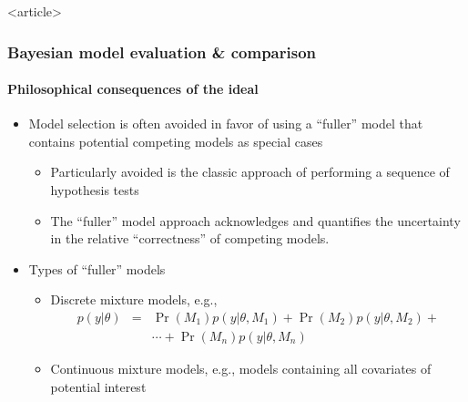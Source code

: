 \documentclass{beamer}
\begin{document}
\begin{frame}<article>
  \frametitle{Bayesian model evaluation \& comparison}
  \framesubtitle{\large Philosophical consequences of the ideal}

  \begin{itemize}
  \item Model selection is often avoided in favor of using a
    ``fuller'' model that contains potential competing models as
    special cases
    \begin{itemize}
    \item Particularly avoided is the classic approach of performing a
      sequence of hypothesis tests
    \item The ``fuller'' model approach acknowledges and quantifies
      the uncertainty in the relative ``correctness'' of competing
      models.
    \end{itemize}
  \item Types of ``fuller'' models
    \begin{itemize}
    \item Discrete mixture models, e.g.,
      \begin{eqnarray*}
        p\left(y|\theta\right) &=& \Pr\left(M_1\right) p\left(y|\theta,M_1\right) + \Pr\left(M_2\right) p\left(y|\theta,M_2\right) +\\
        & & \cdots + \Pr\left(M_n\right) p\left(y|\theta,M_n\right) 
      \end{eqnarray*}
    \item Continuous mixture models, e.g., models containing all
      covariates of potential interest
    \end{itemize}
  \end{itemize}

\end{frame}
\end{document}
